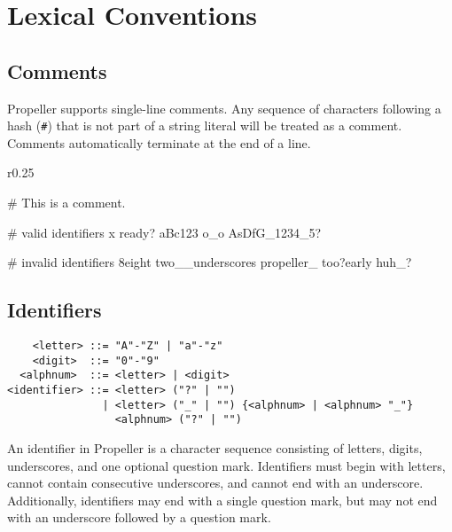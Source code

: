\section{Lexical Conventions}

\subsection{Comments}
Propeller supports single-line comments. Any sequence of characters following a hash (\verb|#|) that is not part of a
string literal will be treated as a comment. Comments automatically terminate at the end of a line.

\begin{wrapfigure}{r}{0.25\textwidth}
\vspace{-4.5cm}
\begin{mylistingn}
# This is a comment.

# valid identifiers
x
ready?
aBc123
o_o
AsDfG_1234_5?

# invalid identifiers
8eight
two__underscores
propeller_
too?early
huh_?
\end{mylistingn}
\end{wrapfigure}

\subsection{Identifiers}
\begin{verbatim}
    <letter> ::= "A"-"Z" | "a"-"z"
    <digit>  ::= "0"-"9"
  <alphnum>  ::= <letter> | <digit>
<identifier> ::= <letter> ("?" | "")
               | <letter> ("_" | "") {<alphnum> | <alphnum> "_"}
                 <alphnum> ("?" | "")
\end{verbatim}

An identifier in Propeller is a character sequence consisting of letters, digits, underscores, and one
optional question mark. Identifiers must begin with letters, cannot contain consecutive underscores,
and cannot end with an underscore. Additionally, identifiers may end with a single question mark,
but may not end with an underscore followed by a question mark.

